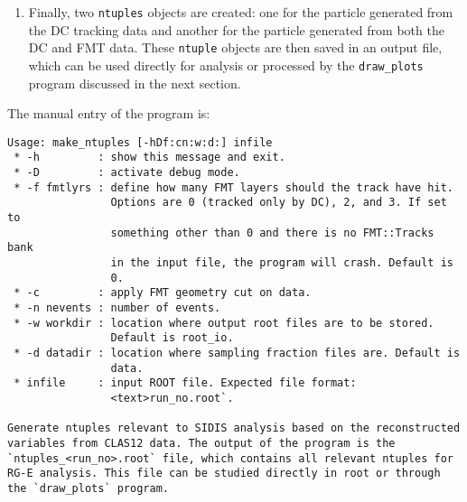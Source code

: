 \begin{enumerate}
        \item
            Finally, two \texttt{ntuples} objects are created: one for the particle generated from the DC tracking data and another for the particle generated from both the DC and FMT data.
            These \texttt{ntuple} objects are then saved in an output file, which can be used directly for analysis or processed by the \texttt{draw\_plots} program discussed in the next section.
    \end{enumerate}

    \pagebreak

    The manual entry of the program is:
    \begin{lstlisting}
Usage: make_ntuples [-hDf:cn:w:d:] infile
 * -h         : show this message and exit.
 * -D         : activate debug mode.
 * -f fmtlyrs : define how many FMT layers should the track have hit.
                Options are 0 (tracked only by DC), 2, and 3. If set to
                something other than 0 and there is no FMT::Tracks bank
                in the input file, the program will crash. Default is
                0.
 * -c         : apply FMT geometry cut on data.
 * -n nevents : number of events.
 * -w workdir : location where output root files are to be stored.
                Default is root_io.
 * -d datadir : location where sampling fraction files are. Default is
                data.
 * infile     : input ROOT file. Expected file format:
                <text>run_no.root`.

Generate ntuples relevant to SIDIS analysis based on the reconstructed variables from CLAS12 data. The output of the program is the `ntuples_<run_no>.root` file, which contains all relevant ntuples for RG-E analysis. This file can be studied directly in root or through the `draw_plots` program.
    \end{lstlisting}
